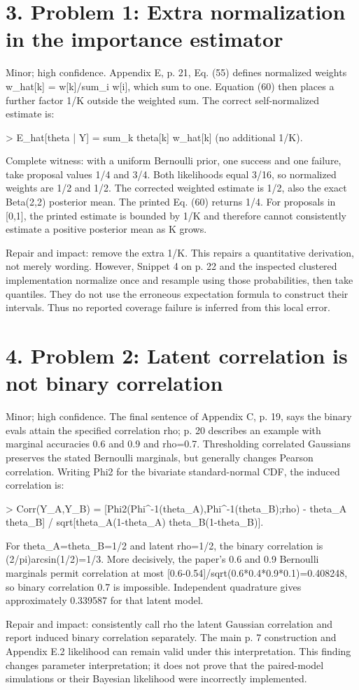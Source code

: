 \documentclass[10pt]{article}
\begin{document}
\section*{3. Problem 1: Extra normalization in the importance estimator}
Minor; high confidence. Appendix E, p. 21, Eq. (55) defines normalized weights w\_hat[k] = w[k]/sum\_i w[i], which sum to one. Equation (60) then places a further factor 1/K outside the weighted sum. The correct self-normalized estimate is:\par
> E\_hat[theta | Y] = sum\_k theta[k] w\_hat[k] (no additional 1/K).\par
Complete witness: with a uniform Bernoulli prior, one success and one failure, take proposal values 1/4 and 3/4. Both likelihoods equal 3/16, so normalized weights are 1/2 and 1/2. The corrected weighted estimate is 1/2, also the exact Beta(2,2) posterior mean. The printed Eq. (60) returns 1/4. For proposals in [0,1], the printed estimate is bounded by 1/K and therefore cannot consistently estimate a positive posterior mean as K grows.\par
Repair and impact: remove the extra 1/K. This repairs a quantitative derivation, not merely wording. However, Snippet 4 on p. 22 and the inspected clustered implementation normalize once and resample using those probabilities, then take quantiles. They do not use the erroneous expectation formula to construct their intervals. Thus no reported coverage failure is inferred from this local error.\par
\section*{4. Problem 2: Latent correlation is not binary correlation}
Minor; high confidence. The final sentence of Appendix C, p. 19, says the binary evals attain the specified correlation rho; p. 20 describes an example with marginal accuracies 0.6 and 0.9 and rho=0.7. Thresholding correlated Gaussians preserves the stated Bernoulli marginals, but generally changes Pearson correlation. Writing Phi2 for the bivariate standard-normal CDF, the induced correlation is:\par
> Corr(Y\_A,Y\_B) = [Phi2(Phi\textasciicircum{}-1(theta\_A),Phi\textasciicircum{}-1(theta\_B);rho) - theta\_A theta\_B] / sqrt[theta\_A(1-theta\_A) theta\_B(1-theta\_B)].\par
For theta\_A=theta\_B=1/2 and latent rho=1/2, the binary correlation is (2/pi)arcsin(1/2)=1/3. More decisively, the paper’s 0.6 and 0.9 Bernoulli marginals permit correlation at most [0.6-0.54]/sqrt(0.6*0.4*0.9*0.1)=0.408248, so binary correlation 0.7 is impossible. Independent quadrature gives approximately 0.339587 for that latent model.\par
Repair and impact: consistently call rho the latent Gaussian correlation and report induced binary correlation separately. The main p. 7 construction and Appendix E.2 likelihood can remain valid under this interpretation. This finding changes parameter interpretation; it does not prove that the paired-model simulations or their Bayesian likelihood were incorrectly implemented.\par
\end{document}
